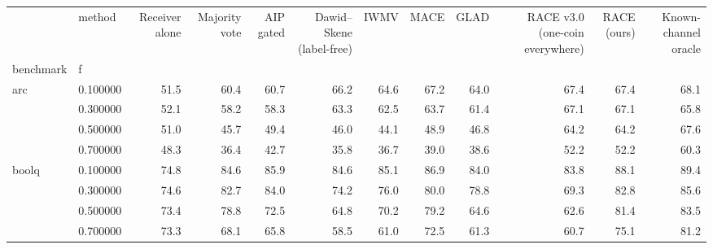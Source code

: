 \begin{tabular}{llrrrrrrrrrr}
\toprule
 & method & Receiver alone & Majority vote & AIP gated & Dawid–Skene (label-free) & IWMV & MACE & GLAD & RACE v3.0 (one-coin everywhere) & RACE (ours) & Known-channel oracle \\
benchmark & f &  &  &  &  &  &  &  &  &  &  \\
\midrule
\multirow[t]{4}{*}{arc} & 0.100000 & 51.5 & 60.4 & 60.7 & 66.2 & 64.6 & 67.2 & 64.0 & 67.4 & 67.4 & 68.1 \\
 & 0.300000 & 52.1 & 58.2 & 58.3 & 63.3 & 62.5 & 63.7 & 61.4 & 67.1 & 67.1 & 65.8 \\
 & 0.500000 & 51.0 & 45.7 & 49.4 & 46.0 & 44.1 & 48.9 & 46.8 & 64.2 & 64.2 & 67.6 \\
 & 0.700000 & 48.3 & 36.4 & 42.7 & 35.8 & 36.7 & 39.0 & 38.6 & 52.2 & 52.2 & 60.3 \\
\cline{1-12}
\multirow[t]{4}{*}{boolq} & 0.100000 & 74.8 & 84.6 & 85.9 & 84.6 & 85.1 & 86.9 & 84.0 & 83.8 & 88.1 & 89.4 \\
 & 0.300000 & 74.6 & 82.7 & 84.0 & 74.2 & 76.0 & 80.0 & 78.8 & 69.3 & 82.8 & 85.6 \\
 & 0.500000 & 73.4 & 78.8 & 72.5 & 64.8 & 70.2 & 79.2 & 64.6 & 62.6 & 81.4 & 83.5 \\
 & 0.700000 & 73.3 & 68.1 & 65.8 & 58.5 & 61.0 & 72.5 & 61.3 & 60.7 & 75.1 & 81.2 \\
\cline{1-12}
\bottomrule
\end{tabular}
